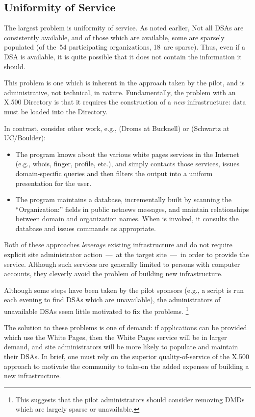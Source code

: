 \subsection	{Uniformity of Service}\label{uniformity}
The largest problem is uniformity of service.
As noted earlier,
Not all DSAs are consistently available,
and of those which are available,
some are sparsely populated
(of the~54 participating organizations,
18~are sparse).
Thus,
even if a DSA is available,
it is quite possible that it does not contain the information it should.

This problem is one which is inherent in the approach taken by the
pilot,
and is administrative,
not technical, in nature.
Fundamentally,
the problem with an X.500 Directory is that it requires the construction of a
{\em new\/} infrastructure: data must be loaded into the Directory.

In contrast,
consider other work, e.g.,  (Droms at Bucknell)
or  (Schwartz at UC/Boulder):
\begin{itemize}
\item	The  program knows about the various white pages
services in the Internet
(e.g., whois, finger, profile, etc.),
and simply contacts those services,
issues domain-specific queries and then filters the output into a uniform
presentation for the user. 

\item	The  program maintains a database,
incrementally built by scanning the ``Organization:'' fields in public netnews
messages,
and maintain relationships between domain and organization names.
When  is invoked,
it consults the database and issues  commands as appropriate.
\end{itemize}
Both of these approaches {\em leverage\/} existing infrastructure and do not
require explicit site administrator action~---~at the target site~---~in order 
to provide the service.
Although such services are generally limited to persons with computer accounts,
they cleverly avoid the problem of building new infrastructure.

Although some steps have been taken by the pilot sponsors
(e.g., a script is run each evening to find DSAs which are unavailable),
the administrators of unavailable DSAs seem little motivated to fix the
problems.%
\footnote{This suggests that the pilot administrators should consider removing
DMDs which are largely sparse or unavailable.}

The solution to these problems is one of demand:
if applications can be provided which use the White Pages,
then the White Pages service will be in larger demand,
and site administrators will be more likely to populate and maintain their
DSAs.
In brief,
one must rely on the superior quality-of-service of the X.500 approach to
motivate the community to take-on the added expenses of building a new
infrastructure.

